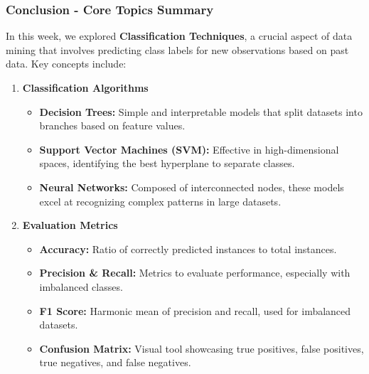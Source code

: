 \documentclass[aspectratio=169]{beamer}
\begin{document}
\begin{frame}[fragile]
    \frametitle{Conclusion - Core Topics Summary}
    
    In this week, we explored \textbf{Classification Techniques}, a crucial aspect of data mining that involves predicting class labels for new observations based on past data. Key concepts include:
    
    \begin{enumerate}
        \item \textbf{Classification Algorithms}
        \begin{itemize}
            \item \textbf{Decision Trees:} Simple and interpretable models that split datasets into branches based on feature values.
            \item \textbf{Support Vector Machines (SVM):} Effective in high-dimensional spaces, identifying the best hyperplane to separate classes.
            \item \textbf{Neural Networks:} Composed of interconnected nodes, these models excel at recognizing complex patterns in large datasets.
        \end{itemize}
        
        \item \textbf{Evaluation Metrics}
        \begin{itemize}
            \item \textbf{Accuracy:} Ratio of correctly predicted instances to total instances.
            \item \textbf{Precision \& Recall:} Metrics to evaluate performance, especially with imbalanced classes.
            \item \textbf{F1 Score:} Harmonic mean of precision and recall, used for imbalanced datasets.
            \item \textbf{Confusion Matrix:} Visual tool showcasing true positives, false positives, true negatives, and false negatives.
        \end{itemize}
    \end{enumerate}

\end{frame}
\end{document}
